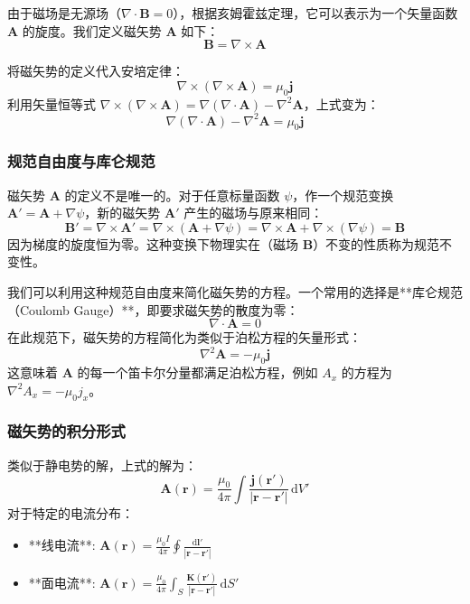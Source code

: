\documentclass[fontset=none]{ctexart}
\begin{document}
\begin{definition}[磁矢势]
由于磁场是无源场（$\nabla \cdot \bm{B} = 0$），根据亥姆霍兹定理，它可以表示为一个矢量函数 $\bm{A}$ 的旋度。我们定义磁矢势 $\bm{A}$ 如下：
\begin{equation}
    \bm{B} = \nabla \times \bm{A}
\end{equation}
\end{definition}

将磁矢势的定义代入安培定律：
\begin{equation}
    \nabla \times (\nabla \times \bm{A}) = \mu_0 \bm{j}
\end{equation}
利用矢量恒等式 $\nabla \times (\nabla \times \bm{A}) = \nabla(\nabla \cdot \bm{A}) - \nabla^2 \bm{A}$，上式变为：
\begin{equation}
    \nabla(\nabla \cdot \bm{A}) - \nabla^2 \bm{A} = \mu_0 \bm{j}
\end{equation}

\subsubsection{规范自由度与库仑规范}
磁矢势 $\bm{A}$ 的定义不是唯一的。对于任意标量函数 $\psi$，作一个规范变换 $\bm{A}' = \bm{A} + \nabla \psi$，新的磁矢势 $\bm{A}'$ 产生的磁场与原来相同：
\begin{equation}
    \bm{B}' = \nabla \times \bm{A}' = \nabla \times (\bm{A} + \nabla \psi) = \nabla \times \bm{A} + \nabla \times (\nabla \psi) = \bm{B}
\end{equation}
因为梯度的旋度恒为零。这种变换下物理实在（磁场 $\bm{B}$）不变的性质称为规范不变性。

我们可以利用这种规范自由度来简化磁矢势的方程。一个常用的选择是**库仑规范（Coulomb Gauge）**，即要求磁矢势的散度为零：
\begin{equation}
    \nabla \cdot \bm{A} = 0
\end{equation}
在此规范下，磁矢势的方程简化为类似于泊松方程的矢量形式：
\begin{equation}
    \nabla^2 \bm{A} = -\mu_0 \bm{j}
\end{equation}
这意味着 $\bm{A}$ 的每一个笛卡尔分量都满足泊松方程，例如 $A_x$ 的方程为 $\nabla^2 A_x = -\mu_0 j_x$。

\subsubsection{磁矢势的积分形式}
类似于静电势的解，上式的解为：
\begin{equation}
    \bm{A}(\bm{r}) = \frac{\mu_0}{4\pi} \int \frac{\bm{j}(\bm{r'})}{|\bm{r} - \bm{r'}|} \, \mathrm{d}V'
\end{equation}
对于特定的电流分布：
\begin{itemize}
    \item **线电流**: $\bm{A}(\bm{r}) = \frac{\mu_0 I}{4\pi} \oint \frac{\mathrm{d}\bm{l'}}{|\bm{r} - \bm{r'}|}$
    \item **面电流**: $\bm{A}(\bm{r}) = \frac{\mu_0}{4\pi} \int_S \frac{\bm{K}(\bm{r'})}{|\bm{r} - \bm{r'}|} \, \mathrm{d}S'$
\end{itemize}
\end{document}
